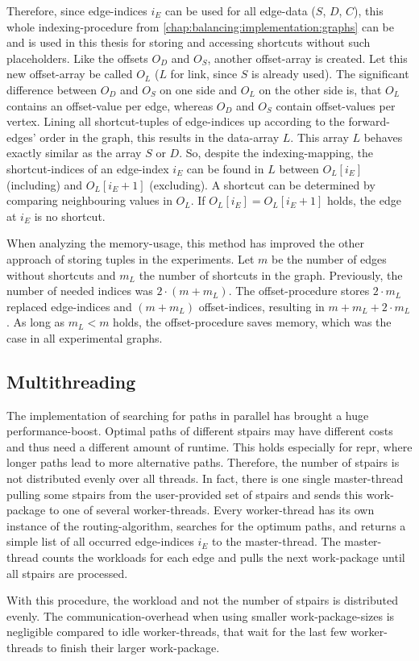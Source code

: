        Therefore, since edge-indices $i_E$ can be used for all edge-data ($S$, $D$, $C$), this whole indexing-procedure from \cref{chap:balancing:implementation:graphs} can be and is used in this thesis for storing and accessing shortcuts without such placeholders.
        Like the offsets $O_D$ and $O_S$, another offset-array is created.
        Let this new offset-array be called $O_L$ ($L$ for link, since $S$ is already used).
        The significant difference between $O_D$ and $O_S$ on one side and $O_L$ on the other side is, that $O_L$ contains an offset-value per edge, whereas $O_D$ and $O_S$ contain offset-values per vertex.
        Lining all shortcut-tuples of edge-indices up according to the forward-edges' order in the graph, this results in the data-array $L$.
        This array $L$ behaves exactly similar as the array $S$ or $D$.
        So, despite the indexing-mapping, the shortcut-indices of an edge-index $i_E$ can be found in $L$ between $O_L \left[ i_E \right]$ (including) and $O_L \left[ i_E + 1 \right]$ (excluding).
        A shortcut can be determined by comparing neighbouring values in $O_L$.
        If $O_L \left[ i_E \right] = O_L \left[ i_E + 1 \right]$ holds, the edge at $i_E$ is no shortcut.

        When analyzing the memory-usage, this method has improved the other approach of storing tuples in the experiments.
        Let $m$ be the number of edges without shortcuts and $m_L$ the number of shortcuts in the graph.
        Previously, the number of needed indices was $2 \cdot (m + m_L)$.
        The offset-procedure stores $2 \cdot m_L$ replaced edge-indices and $(m + m_L)$ offset-indices, resulting in $m + m_L + 2 \cdot m_L$.
        As long as $m_L < m$ holds, the offset-procedure saves memory, which was the case in all experimental graphs.

    \subsection{Multithreading}

        The implementation of searching for paths in parallel has brought a huge performance-boost.
        Optimal paths of different \glspl{stpair} may have different costs and thus need a different amount of runtime.
        This holds especially for \gls{repr}, where longer paths lead to more alternative paths.
        Therefore, the number of \glspl{stpair} is not distributed evenly over all threads.
        In fact, there is one single master-thread pulling some \glspl{stpair} from the user-provided set of \glspl{stpair} and sends this work-package to one of several worker-threads.
        Every worker-thread has its own instance of the routing-algorithm, searches for the optimum paths, and returns a simple list of all occurred edge-indices $i_E$ to the master-thread.
        The master-thread counts the workloads for each edge and pulls the next work-package until all \glspl{stpair} are processed.

        With this procedure, the workload and not the number of \glspl{stpair} is distributed evenly.
        The communication-overhead when using smaller work-package-sizes is negligible compared to idle worker-threads, that wait for the last few worker-threads to finish their larger work-package.